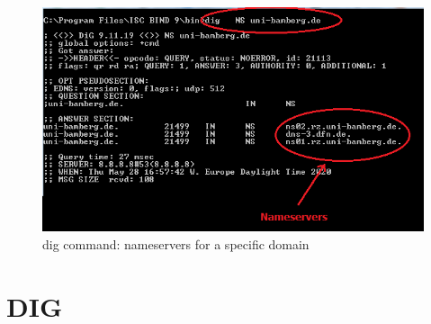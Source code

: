 \begin{figure}[H]
\centering
  \includegraphics[width=.6\textwidth]{Images/Image1-3-digForaDomain.png}
  \caption{dig command: nameservers for a specific domain}
  \label{fig:1.3}
\end{figure}

\section{DIG}

\section{}

